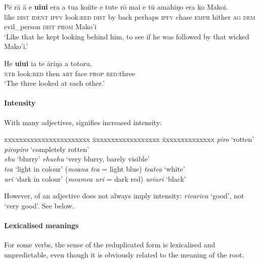 \ea\label{ex:2.22}
\gll Pē rā {\ꞌ}ā e \textbf{u{\ꞌ}iu{\ꞌ}i} era a tu{\ꞌ}a koi{\ꞌ}ite e tute rō mai  e tū {\ꞌ}amahiŋo era ko Mako{\ꞌ}i.\\
like \textsc{dist} \textsc{ident} \textsc{ipfv} look:\textsc{red} \textsc{dist} by back perhaps \textsc{ipfv} chase \textsc{emph} hither  \textsc{ag} \textsc{dem} evil\_person \textsc{dist} \textsc{prom} Mako’i\\

\glt 
‘Like that he kept looking behind him, to see if he was followed by that wicked Mako’i.’ \textstyleExampleref{[R214.038]} 
\z

\ea\label{ex:2.23}
\gll He \textbf{u{\ꞌ}iu{\ꞌ}i} ia te {\ꞌ}āriŋa a totoru. \\
\textsc{ntr} look:\textsc{red} then \textsc{art} face \textsc{prop} \textsc{red}:three \\

\glt 
‘The three looked at each other.’ \textstyleExampleref{[R313.005]} 
\z

\newpage 
\paragraph{Intensity}\label{sec:2.6.2.2.3} With many adjectives,  signifies increased intensity:
\ea
\begin{tabbing}
xxxxxxxxxxxxxxxxxxxxxxx \= xxxxxxxxxxxxxxxxxx \= xxxxxxxxxxxxxx \kill
  \textit{piro} ‘rotten’ \> \textit{piropiro} ‘completely rotten’\\
  \textit{{\ꞌ}ehu} ‘blurry’ \> \textit{{\ꞌ}ehu{\ꞌ}ehu} ‘very blurry, barely visible’\\
  \textit{tea} ‘light in colour’ (\textit{moana tea} = light blue) \>\> \textit{teatea} ‘white’\\
  \textit{{\ꞌ}uri} ‘dark in colour’ (\textit{meamea {\ꞌ}uri} = dark red) \>\> \textit{{\ꞌ}uri{\ꞌ}uri} ‘black’
\end{tabbing}
\z 
However,  of an adjective does not always imply intensity: \textit{rivariva} ‘good’, not ‘very good’. See  below.

\paragraph{Lexicalised meanings}\label{sec:2.6.2.2.4} For some verbs, the sense of the reduplicated form is lexicalised and unpredictable, even though it is obviously related to the meaning of the root.

